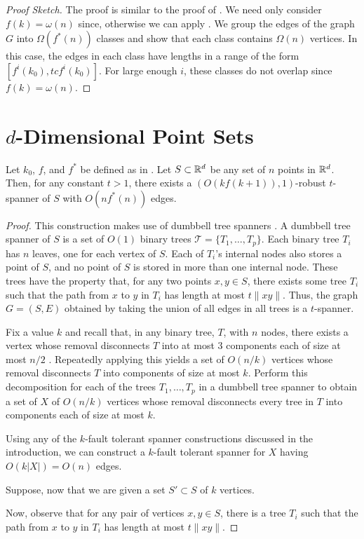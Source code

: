 \documentclass{patmorin}
\begin{document}
\begin{proof}[Proof Sketch]
The proof is similar to the proof of .
We need only consider $f(k)=\omega(n)$ since, otherwise we can apply
.  We group the edges of the graph $G$ into
$\Omega(f^*(n))$ classes and show that each class contains $\Omega(n)$
vertices.  In this case, the edges in each class have lengths in a
range of the form $[f^i(k_0),tcf^{i}(k_0)]$.  For large enough $i$,
these classes do not overlap since $f(k)=\omega(n)$.
\end{proof}





\section{$d$-Dimensional Point Sets}

\begin{thm}
Let $k_0$, $f$, and $f^*$ be defined as in .
Let $S\subset \mathbb{R}^d$ be any set of $n$ points in $\mathbb{R}^d$.  Then, for any
constant $t>1$,  there exists a $(O(kf(k+1)),1)$-robust $t$-spanner of $S$
with $O(nf^*(n))$ edges.
\end{thm}

\begin{proof} 
This construction makes use of dumbbell tree spanners \cite{X}.
A dumbbell tree spanner of $S$ is a set of $O(1)$ binary trees
$\mathcal{T}=\{T_1,\ldots,T_p\}$.  Each binary tree $T_i$ has $n$ leaves,
one for each vertex of $S$.  Each of $T_i$'s internal nodes also stores
a point of $S$, and no point of $S$ is stored in more than one internal
node.  These trees have the property that, for any two points $x,y\in S$,
there exists some tree $T_i$ such that the path from $x$ to $y$ in $T_i$
has length at most $t\|xy\|$.  Thus, the graph $G=(S,E)$ obtained by
taking the union of all edges in all trees is a $t$-spanner.

Fix a value $k$ and recall that, in any binary tree, $T$, with $n$ nodes,
there exists a vertex whose removal disconnects $T$ into at most 3
components each of size at most $n/2$ \cite{S}.  Repeatedly applying this
yields a set of $O(n/k)$ vertices whose removal disconnects $T$ into
components of size at most $k$.  Perform this decomposition for each of
the trees $T_1,\ldots,T_p$ in a dumbbell tree spanner to obtain a set
of $X$ of $O(n/k)$ vertices whose removal disconnects every tree in $T$
into components each of size at most $k$.

Using any of the $k$-fault tolerant spanner constructions discussed in
the introduction, we can construct a $k$-fault tolerant spanner for $X$
having $O(k|X|)=O(n)$ edges. 

Suppose, now that we are given a set $S'\subset S$ of $k$ vertices.

  Now, observe that for any pair of vertices
$x,y\in S$, there is a tree $T_i$ such that the path from $x$ to $y$ in $T_i$ has length at most $t\|xy\|$.



\end{proof}
\end{document}
